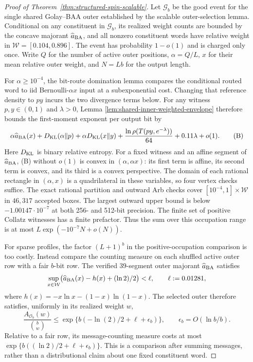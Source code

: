 \begin{proof}[Proof of Theorem~\ref{thm:structured-spin-scalable}]
Let $\mathcal G_b$ be the good event for the single shared Golay--BAA
outer established by the scalable outer-selection lemma. Conditional
on any constituent in $\mathcal G_b$, its realized weight counts are
bounded by the concave majorant $\widehat a_{\rm BA}$, and all nonzero
constituent words have relative weight in
$\mathcal W=[0.104,0.896]$. The event has probability $1-o(1)$ and is
charged only once. Write $Q$ for the number of active outer positions,
$\alpha=Q/L$, $x$ for their mean relative outer weight, and
$N=Lb$ for the output length.

For $\alpha\ge10^{-4}$, the bit-route domination lemma compares the
conditional routed word to iid Bernoulli-$\alpha x$ input at a
subexponential cost. Changing that reference density to $py$ incurs
the two divergence terms below. For any witness $p,y\in(0,1)$ and
$\lambda>0$, Lemma
\ref{lem:shared-inner-weighted-envelope} therefore bounds the
first-moment exponent per output bit by
\[
 \alpha\widehat a_{\rm BA}(x)
 +D_{\rm KL}(\alpha\Vert p)+\alpha D_{\rm KL}(x\Vert y)
 +\frac{\ln\rho(T(py,e^{-\lambda}))}{64}+0.11\lambda+o(1).
 \tag{B}
\]
Here $D_{\rm KL}$ is binary relative entropy. For a fixed witness and
an affine segment of $\widehat a_{\rm BA}$, (B) without $o(1)$ is
convex in $(\alpha,\alpha x)$: its first term is affine, its second
term is convex, and its third is a convex perspective. The domain of
each rational rectangle in $(\alpha,x)$ is a quadrilateral in these
variables, so four vertex checks suffice. The exact rational
partition and outward Arb checks cover
$[10^{-4},1]\times\mathcal W$ in $46{,}317$ accepted boxes. The
largest outward upper bound is below $-1.00147\cdot10^{-7}$ at both
256- and 512-bit precision. The finite set of positive Collatz
witnesses has a finite prefactor. Thus the sum over this occupation
range is at most $L\exp(-10^{-7}N+o(N))$.

For sparse profiles, the factor $(L+1)^b$ in the positive-occupation
comparison is too costly. Instead compare the counting measure on each
shuffled active outer row with a fair $b$-bit row. The verified
$39$-segment outer majorant $\widehat a_{\rm BA}$ satisfies
\[
 \sup_{x\in\mathcal W}
 \bigl(\widehat a_{\rm BA}(x)-h(x)+(\ln2)/2\bigr)<\ell,
 \qquad \ell:=0.01281,
\]
where $h(x)=-x\ln x-(1-x)\ln(1-x)$. The selected outer therefore
satisfies, uniformly in its realized weight $w$,
\begin{equation}
 \frac{A_{\mathcal O_b}(w)}{\binom bw}
 \le\exp\{b(-\ln(2)/2+\ell+\epsilon_b)\},
 \qquad\epsilon_b=O(\ln b/b).
 \label{eq:shared-row-likelihood}
\end{equation}
Relative to a fair row, its message-counting measure costs at most
$\exp\{b((\ln2)/2+\ell+\epsilon_b)\}$. This is a comparison after
summing messages, rather than a distributional claim about one fixed
constituent word.


\end{proof}
